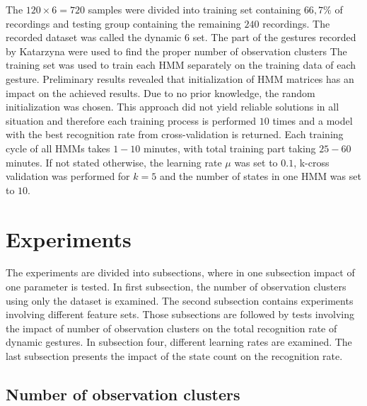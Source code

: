 The $120\times6=720$ samples were divided into training set containing $66,7\%$ of recordings and testing group containing the remaining $240$ recordings. 
The recorded dataset was called the dynamic 6 set.
The part of the gestures recorded by Katarzyna were used to find the proper number of observation clusters
The training set was used to train each HMM separately on the training data of each gesture.
Preliminary results revealed that initialization of HMM matrices has an impact on the achieved results.
Due to no prior knowledge, the random initialization was chosen.
This approach did not yield reliable solutions in all situation and therefore each training process is performed $10$ times and a model with the best recognition rate from cross-validation is returned.  
Each training cycle of all HMMs takes $1-10$ minutes, with total training part taking $25-60$ minutes.
If not stated otherwise, the learning rate $\mu$ was set to $0.1$, k-cross validation was performed for $k=5$ and the number of states in one HMM was set to $10$.


\section{Experiments}
The experiments are divided into subsections, where in one subsection impact of one parameter is tested.
In first subsection, the number of observation clusters using only the dataset is examined.
The second subsection contains experiments involving different feature sets.
Those subsections are followed by tests involving the impact of number of observation clusters on the total recognition rate of dynamic gestures.
In subsection four, different learning rates are examined. The last subsection presents the impact of the state count on the recognition rate. 

\subsection{Number of observation clusters} \label{numberOfClasses1}

